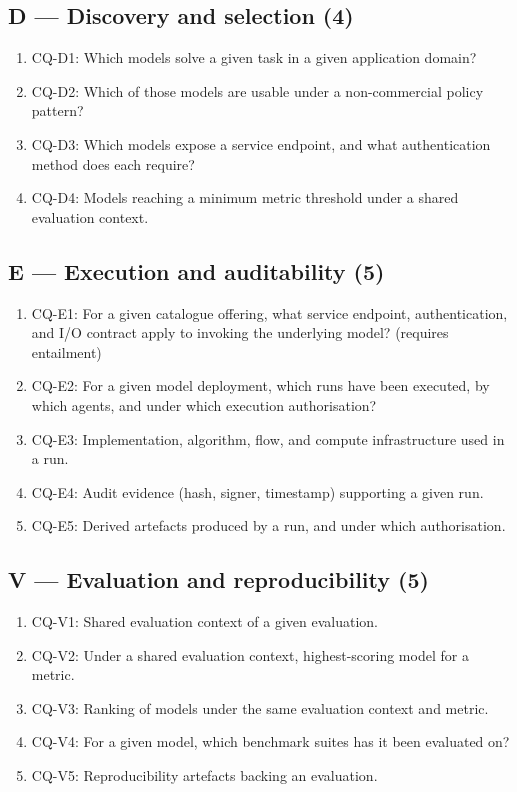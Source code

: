 \documentclass[Afour,sagev,times]{sagej}
\newcommand{\cq}[1]{\textsf{#1}}
\begin{document}
\subsection*{D --- Discovery and selection (4)}
\begin{enumerate}[label=\arabic*., leftmargin=*]
\item \cq{CQ-D1}: Which models solve a given task in a given application domain?
\item \cq{CQ-D2}: Which of those models are usable under a non-commercial policy pattern?
\item \cq{CQ-D3}: Which models expose a service endpoint, and what authentication method does each require?
\item \cq{CQ-D4}: Models reaching a minimum metric threshold under a shared evaluation context.
\end{enumerate}

\subsection*{E --- Execution and auditability (5)}
\begin{enumerate}[label=\arabic*., leftmargin=*]
\item \cq{CQ-E1}: For a given catalogue offering, what service endpoint, authentication, and I/O contract apply to invoking the underlying model? (requires entailment)
\item \cq{CQ-E2}: For a given model deployment, which runs have been executed, by which agents, and under which execution authorisation?
\item \cq{CQ-E3}: Implementation, algorithm, flow, and compute infrastructure used in a run.
\item \cq{CQ-E4}: Audit evidence (hash, signer, timestamp) supporting a given run.
\item \cq{CQ-E5}: Derived artefacts produced by a run, and under which authorisation.
\end{enumerate}

\subsection*{V --- Evaluation and reproducibility (5)}
\begin{enumerate}[label=\arabic*., leftmargin=*]
\item \cq{CQ-V1}: Shared evaluation context of a given evaluation.
\item \cq{CQ-V2}: Under a shared evaluation context, highest-scoring model for a metric.
\item \cq{CQ-V3}: Ranking of models under the same evaluation context and metric.
\item \cq{CQ-V4}: For a given model, which benchmark suites has it been evaluated on?
\item \cq{CQ-V5}: Reproducibility artefacts backing an evaluation.
\end{enumerate}
\end{document}
